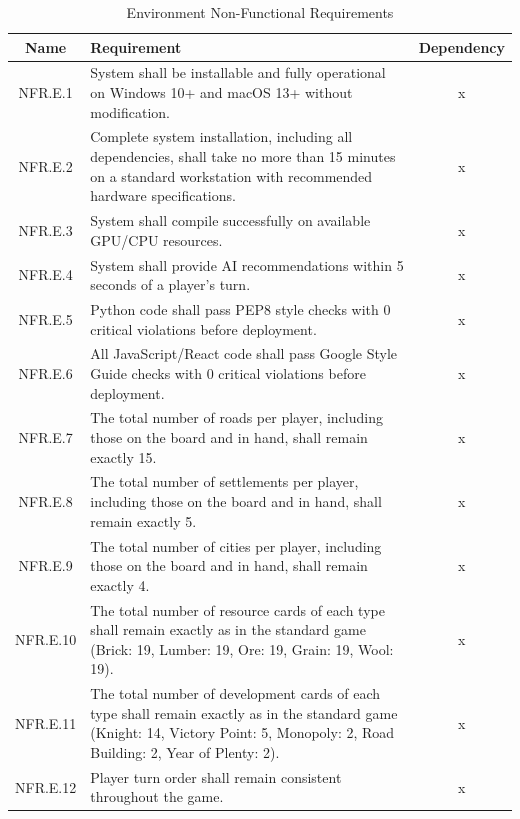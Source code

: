 \documentclass{article}
\begin{document}
\begin{table}[h!]
    \centering
    \begin{tabular}{|c|p{10cm}|c|}
    \hline
    \textbf{Name} & \textbf{Requirement} & \textbf{Dependency} \\
    \hline
    NFR.E.1 & System shall be installable and fully operational on Windows 10+ and macOS 13+ without modification. & x \\
    \hline
    NFR.E.2 & Complete system installation, including all dependencies, shall take no more than 15 minutes on a standard workstation with recommended hardware specifications. & x \\
    \hline
    NFR.E.3 & System shall compile successfully on available GPU/CPU resources. & x \\
    \hline
    NFR.E.4 & System shall provide AI recommendations within 5 seconds of a player’s turn. & x \\
    \hline
    NFR.E.5 & Python code shall pass PEP8 style checks with 0 critical violations before deployment. & x \\
    \hline
    NFR.E.6 & All JavaScript/React code shall pass Google Style Guide checks with 0 critical violations before deployment. & x \\
    \hline
    NFR.E.7 & The total number of roads per player, including those on the board and in hand, shall remain exactly 15. & x \\
    \hline
    NFR.E.8 & The total number of settlements per player, including those on the board and in hand, shall remain exactly 5. & x \\
    \hline
    NFR.E.9 & The total number of cities per player, including those on the board and in hand, shall remain exactly 4. & x \\
    \hline
    NFR.E.10 & The total number of resource cards of each type shall remain exactly as in the standard game (Brick: 19, Lumber: 19, Ore: 19, Grain: 19, Wool: 19). & x \\
    \hline
    NFR.E.11 & The total number of development cards of each type shall remain exactly as in the standard game (Knight: 14, Victory Point: 5, Monopoly: 2, Road Building: 2, Year of Plenty: 2). & x \\
    \hline
    NFR.E.12 & Player turn order shall remain consistent throughout the game. & x \\
    \hline
    \end{tabular}
    \caption{Environment Non-Functional Requirements }
    \label{tab:nfr}
\end{table}
\end{document}
